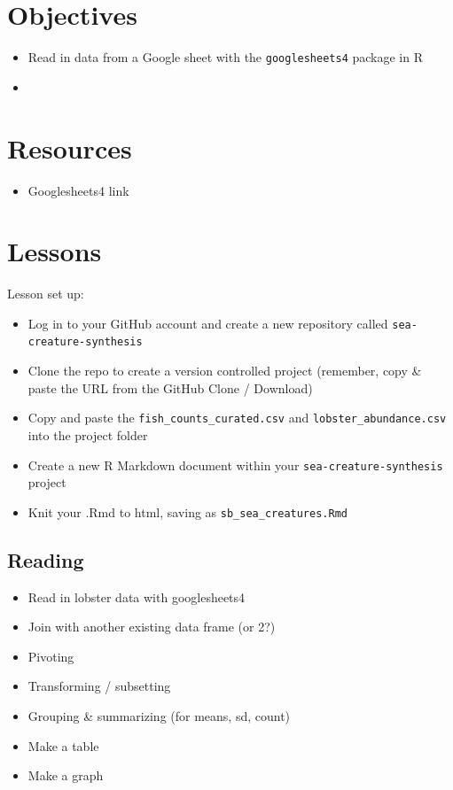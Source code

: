 \documentclass[]{book}
\providecommand{\tightlist}{%
  \setlength{\itemsep}{0pt}\setlength{\parskip}{0pt}}
\begin{document}
\hypertarget{objectives-2}{%
\section{Objectives}\label{objectives-2}}

\begin{itemize}
\item
  Read in data from a Google sheet with the \texttt{googlesheets4} package in R
\item
\end{itemize}

\hypertarget{resources-7}{%
\section{Resources}\label{resources-7}}

\begin{itemize}
\tightlist
\item
  Googlesheets4 link
\end{itemize}

\hypertarget{lessons-1}{%
\section{Lessons}\label{lessons-1}}

Lesson set up:

\begin{itemize}
\tightlist
\item
  Log in to your GitHub account and create a new repository called \texttt{sea-creature-synthesis}
\item
  Clone the repo to create a version controlled project (remember, copy \& paste the URL from the GitHub Clone / Download)
\item
  Copy and paste the \texttt{fish\_counts\_curated.csv} and \texttt{lobster\_abundance.csv} into the project folder
\item
  Create a new R Markdown document within your \texttt{sea-creature-synthesis} project
\item
  Knit your .Rmd to html, saving as \texttt{sb\_sea\_creatures.Rmd}
\end{itemize}

\hypertarget{reading}{%
\subsection{Reading}\label{reading}}

\begin{itemize}
\tightlist
\item
  Read in lobster data with googlesheets4
\item
  Join with another existing data frame (or 2?)
\item
  Pivoting
\item
  Transforming / subsetting
\item
  Grouping \& summarizing (for means, sd, count)
\item
  Make a table
\item
  Make a graph
\end{itemize}
\end{document}
